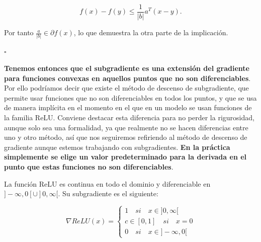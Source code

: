 $$f(x) - f(y) \leq \frac{1}{|b|} a^T (x-y).$$

Por tanto $\frac{a}{|b|} \in \partial f(x)$, lo que demuestra la otra parte de la implicación.

\begin{flushright}
    $\square$
\end{flushright} 





\textbf{Tenemos entonces que el subgradiente es una extensión del gradiente para funciones convexas en aquellos puntos que no son diferenciables}. Por ello podríamos decir que existe el método de descenso de subgradiente, que permite usar funciones que no son diferenciables en todos los puntos, y que se usa de manera implícita en el momento en el que en un modelo se usan funciones de la familia ReLU. Conviene destacar esta diferencia para no perder la rigurosidad, aunque solo sea una formalidad, ya que realmente no se hacen diferencias entre uno y otro método, así que nos seguiremos refiriendo al método de descenso de gradiente aunque estemos trabajando con subgradientes. \textbf{En la práctica simplemente se elige un valor predeterminado para la derivada en el punto que estas funciones no son diferenciables}.

\begin{ejemplo}\label{ej:RELUsub}
     La función ReLU es continua en todo el dominio y diferenciable en $]-\infty,0[ \cup ]0,\infty[$. Su subgradiente es el siguiente:

    $$ \nabla ReLU(x)=\left\{\begin{matrix}
1 \quad si \quad x \in ]0,\infty[ \\
c \in [0,1] \quad si \quad x=0\\
0 \quad si \quad x \in ]-\infty,0[
\end{matrix}\right.$$
\end{ejemplo}

